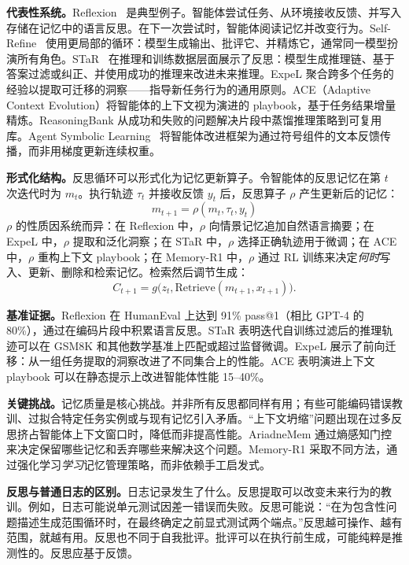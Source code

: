 \textbf{代表性系统。}Reflexion~\cite{reflexion2023} 是典型例子。智能体尝试任务、从环境接收反馈、并写入存储在记忆中的语言反思。在下一次尝试时，智能体阅读记忆并改变行为。Self-Refine~\cite{selfrefine2023} 使用更局部的循环：模型生成输出、批评它、并精炼它，通常同一模型扮演所有角色。STaR~\cite{star2022} 在推理和训练数据层面展示了反思：模型生成推理链、基于答案过滤或纠正、并使用成功的推理来改进未来推理。ExpeL 聚合跨多个任务的经验以提取可迁移的洞察——指导新任务行为的通用原则。ACE（Adaptive Context Evolution）将智能体的上下文视为演进的 playbook，基于任务结果增量精炼。ReasoningBank 从成功和失败的问题解决片段中蒸馏推理策略到可复用库。Agent Symbolic Learning~\cite{agentsymboliclearning2024} 将智能体改进框架为通过符号组件的文本反馈传播，而非用梯度更新连续权重。

\textbf{形式化结构。}反思循环可以形式化为记忆更新算子。令智能体的反思记忆在第 $t$ 次迭代时为 $m_t$。执行轨迹 $\tau_t$ 并接收反馈 $y_t$ 后，反思算子 $\rho$ 产生更新后的记忆：
\begin{equation}\label{eq:ch2-reflection-update}
m_{t+1} = \rho(m_t, \tau_t, y_t)
\end{equation}
$\rho$ 的性质因系统而异：在 Reflexion 中，$\rho$ 向情景记忆追加自然语言摘要；在 ExpeL 中，$\rho$ 提取和泛化洞察；在 STaR 中，$\rho$ 选择正确轨迹用于微调；在 ACE 中，$\rho$ 重构上下文 playbook；在 Memory-R1 中，$\rho$ 通过 RL 训练来决定\emph{何时}写入、更新、删除和检索记忆。检索然后调节生成：
\begin{equation}\label{eq:ch2-reflection-retrieval}
  C_{t+1} = g\bigl(z_t, \mathrm{Retrieve}(m_{t+1}, x_{t+1})\bigr).
\end{equation}

\textbf{基准证据。}Reflexion 在 HumanEval 上达到 91\% pass@1（相比 GPT-4 的 80\%），通过在编码片段中积累语言反思。STaR 表明迭代自训练过滤后的推理轨迹可以在 GSM8K 和其他数学基准上匹配或超过监督微调。ExpeL 展示了前向迁移：从一组任务提取的洞察改进了不同集合上的性能。ACE 表明演进上下文 playbook 可以在静态提示上改进智能体性能 15--40\%。

\textbf{关键挑战。}记忆质量是核心挑战。并非所有反思都同样有用；有些可能编码错误教训、过拟合特定任务实例或与现有记忆引入矛盾。``上下文坍缩''问题出现在过多反思挤占智能体上下文窗口时，降低而非提高性能。AriadneMem 通过熵感知门控来决定保留哪些记忆和丢弃哪些来解决这个问题。Memory-R1 采取不同方法，通过强化学习\emph{学习}记忆管理策略，而非依赖手工启发式。

\textbf{反思与普通日志的区别。}日志记录发生了什么。反思提取可以改变未来行为的教训。例如，日志可能说单元测试因差一错误而失败。反思可能说：``在为包含性问题描述生成范围循环时，在最终确定之前显式测试两个端点。''反思越可操作、越有范围，就越有用。反思也不同于自我批评。批评可以在执行前生成，可能纯粹是推测性的。反思应基于反馈。

